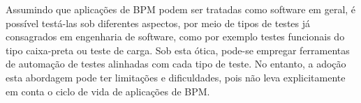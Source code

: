 \documentclass[12pt]{article}
\begin{document}


Assumindo que aplicações de BPM podem ser tratadas como software em geral, é possível testá-las sob diferentes aspectos, por meio de tipos de testes já consagrados em engenharia de software, como por exemplo testes funcionais do tipo caixa-preta ou teste de carga. Sob esta ótica, pode-se empregar ferramentas de automação de testes alinhadas com cada tipo de teste. No entanto, a adoção esta abordagem pode ter limitações e dificuldades, pois não leva explicitamente em conta o ciclo de vida de aplicações de BPM.



\end{document}
